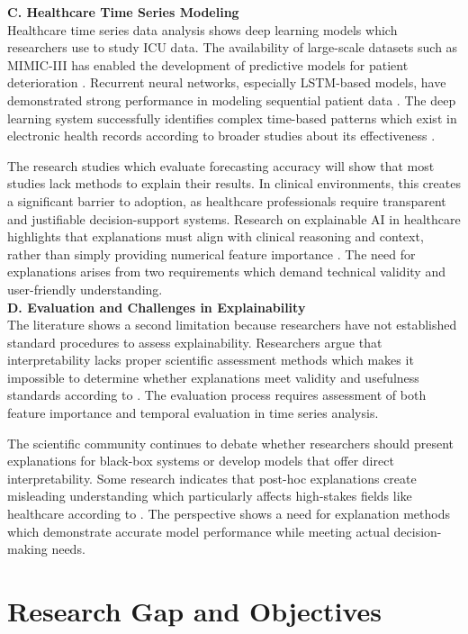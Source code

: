 \documentclass[conference]{IEEEtran}
\begin{document}
\textbf{C. Healthcare Time Series Modeling}\\
Healthcare time series data analysis shows deep learning models which researchers use to study ICU data. The availability of large-scale datasets such as MIMIC-III has enabled the development of predictive models for patient deterioration \cite{johnson2016mimic}. Recurrent neural networks, especially LSTM-based models, have demonstrated strong performance in modeling sequential patient data \cite{lipton2015lstm}. The deep learning system successfully identifies complex time-based patterns which exist in electronic health records according to broader studies about its effectiveness \cite{shickel2017deep, fawaz2019dl4ts}.

The research studies which evaluate forecasting accuracy will show that most studies lack methods to explain their results. In clinical environments, this creates a significant barrier to adoption, as healthcare professionals require transparent and justifiable decision-support systems. Research on explainable AI in healthcare highlights that explanations must align with clinical reasoning and context, rather than simply providing numerical feature importance \cite{holzinger2017xaihealth}. The need for explanations arises from two requirements which demand technical validity and user-friendly understanding.\\

\textbf{D. Evaluation and Challenges in Explainability}\\
The literature shows a second limitation because researchers have not established standard procedures to assess explainability. Researchers argue that interpretability lacks proper scientific assessment methods which makes it impossible to determine whether explanations meet validity and usefulness standards according to \cite{doshi2017rigorous}. The evaluation process requires assessment of both feature importance and temporal evaluation in time series analysis.

The scientific community continues to debate whether researchers should present explanations for black-box systems or develop models that offer direct interpretability. Some research indicates that post-hoc explanations create misleading understanding which particularly affects high-stakes fields like healthcare according to \cite{rudin2019stop}. The perspective shows a need for explanation methods which demonstrate accurate model performance while meeting actual decision-making needs.

\section{Research Gap and Objectives }
\end{document}
